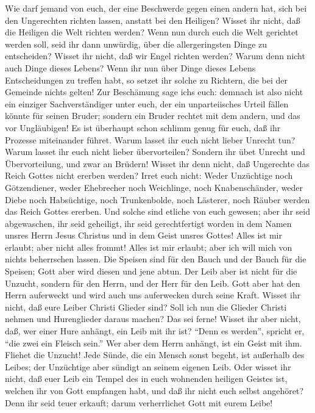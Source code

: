  Wie darf jemand von euch, der eine Beschwerde gegen einen
andern hat, sich bei den Ungerechten richten lassen, anstatt bei den
Heiligen?  Wisset ihr nicht, daß die Heiligen die Welt
richten werden? Wenn nun durch euch die Welt gerichtet werden soll, seid
ihr dann unwürdig, über die allergeringsten Dinge zu entscheiden?
 Wisset ihr nicht, daß wir Engel richten werden? Warum
denn nicht auch Dinge dieses Lebens?  Wenn ihr nun über
Dinge dieses Lebens Entscheidungen zu treffen habt, so setzet ihr solche
zu Richtern, die bei der Gemeinde nichts gelten!  Zur
Beschämung sage ich\textquotesingle s euch: demnach ist also nicht ein
einziger Sachverständiger unter euch, der ein unparteiisches Urteil
fällen könnte für seinen Bruder;  sondern ein Bruder
rechtet mit dem andern, und das vor Ungläubigen!  Es ist
überhaupt schon schlimm genug für euch, daß ihr Prozesse miteinander
führet. Warum lasset ihr euch nicht lieber Unrecht tun? Warum lasset ihr
euch nicht lieber übervorteilen?  Sondern ihr übet Unrecht
und Übervorteilung, und zwar an Brüdern!  Wisset ihr denn
nicht, daß Ungerechte das Reich Gottes nicht ererben werden? Irret euch
nicht: Weder Unzüchtige noch Götzendiener, weder Ehebrecher noch
Weichlinge, noch Knabenschänder,  weder Diebe noch
Habsüchtige, noch Trunkenbolde, noch Lästerer, noch Räuber werden das
Reich Gottes ererben.  Und solche sind etliche von euch
gewesen; aber ihr seid abgewaschen, ihr seid geheiligt, ihr seid
gerechtfertigt worden in dem Namen unsres Herrn Jesus Christus und in
dem Geist unsres Gottes!  Alles ist mir erlaubt; aber
nicht alles frommt! Alles ist mir erlaubt; aber ich will mich von nichts
beherrschen lassen.  Die Speisen sind für den Bauch und
der Bauch für die Speisen; Gott aber wird diesen und jene abtun. Der
Leib aber ist nicht für die Unzucht, sondern für den Herrn, und der Herr
für den Leib.  Gott aber hat den Herrn auferweckt und
wird auch uns auferwecken durch seine Kraft.  Wisset ihr
nicht, daß eure Leiber Christi Glieder sind? Soll ich nun die Glieder
Christi nehmen und Hurenglieder daraus machen? Das sei ferne!
 Wisset ihr aber nicht, daß, wer einer Hure anhängt, ein
Leib mit ihr ist? ``Denn es werden'', spricht er, ``die zwei ein Fleisch
sein.''  Wer aber dem Herrn anhängt, ist ein Geist mit
ihm.  Fliehet die Unzucht! Jede Sünde, die ein Mensch
sonst begeht, ist außerhalb des Leibes; der Unzüchtige aber sündigt an
seinem eigenen Leib.  Oder wisset ihr nicht, daß euer
Leib ein Tempel des in euch wohnenden heiligen Geistes ist, welchen ihr
von Gott empfangen habt, und daß ihr nicht euch selbst angehöret?
 Denn ihr seid teuer erkauft; darum verherrlichet Gott
mit eurem Leibe!

